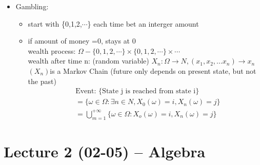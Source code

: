   \begin{example}[Gambling]{}
    \begin{itemize}
        \item Gambling:\begin{itemize}
            \item start with \{0,1,2,$\cdots$\} each time bet an interger amount
            \item if amount of money =0, stays at 0
            \\wealth process: $\Omega-\{0,1,2,\cdots\} \times \{0,1,2,\cdots\} \times \cdots$
            \\wealth after time n: (random variable) $X_n: \Omega \rightarrow N, (x_1,x_2,...x_n) \rightarrow x_n$
            \\$(X_n) $is a Markov Chain (future only depends on present state, but not the past) 
            \begin{align*}
                &\text{Event: \{State j is reached from state i\}}\\
                &=\{\omega \in \Omega: \exists n \in N, X_0(\omega)=i,X_{n}(\omega)=j\}\\
                &=\bigcup_{m=1}^{+\infty}\{\omega\in\Omega:X_o(\omega)=i,X_n(\omega)=j\}
            \end{align*}
          
        \end{itemize}
        
    \end{itemize}
    \end{example}


\section[Lecture 2 (02-05) -- {Algebra}]{Lecture 2 (02-05) -- {Algebra}}
